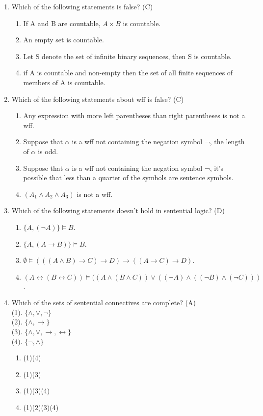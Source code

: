 \documentclass{article}
\begin{document}
\begin{enumerate}
\item Which of the following statements is false? (C)
    \begin{enumerate}
        \item If A and B are countable, $A\times B$ is countable.
        \item An empty set is countable.
        \item Let S denote the set of infinite binary sequences, then S is countable.
        \item if A is countable and non-empty then the set of all finite sequences of members of A is countable.
    \end{enumerate}

\item Which of the following statements about wff is false? (C)
    \begin{enumerate}
    \item Any expression with more left parentheses than right parentheses is not a wff.
    \item Suppose that $\alpha$ is a wff not containing the negation symbol ¬, the length of $\alpha$ is odd.
    \item Suppose that $\alpha$ is a wff not containing the negation symbol ¬, it's possible that less than a quarter of the symbols are sentence symbols.
    \item $(A_1 \land A_2 \land A_3)$ is not a wff.
    \end{enumerate}

\item Which of the following statements doesn't hold in sentential logic? (D)
    \begin{enumerate}
        \item $\{A, (\lnot A)\}\models B$.
        \item $\{A, (A\rightarrow B) \}\models B$.
        \item $\emptyset \models (((A \land B)\rightarrow C)\rightarrow D)\rightarrow ((A\rightarrow C)\rightarrow D)$.
         \item $(A\leftrightarrow (B\leftrightarrow C))\models ((A\land (B\land C))\lor ((\lnot A)\land ((\lnot B)\land (\lnot C)))$.
    \end{enumerate}

\item Which of the sets of sentential connectives are complete? (A)\\
(1). $\{\land, \lor, \lnot \}$ \\
(2). $\{\land, \rightarrow \}$ \\
(3). $\{\land, \lor, \rightarrow, \leftrightarrow \}$ \\
(4). $\{\lnot, \land \}$
    \begin{enumerate}
        \item (1)(4)
        \item (1)(3)
        \item (1)(3)(4)
        \item (1)(2)(3)(4)
    \end{enumerate}


\end{enumerate}
\end{document}
